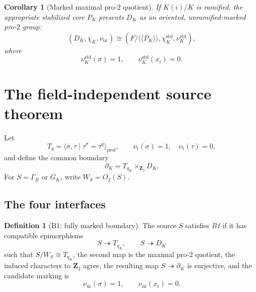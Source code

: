 \documentclass[11pt,reqno]{amsart}
\newtheorem{corollary}[theorem]{Corollary}
\theoremstyle{definition}
\newtheorem{definition}[theorem]{Definition}
\theoremstyle{remark}
\numberwithin{equation}{section}
\newcommand{\Z}{\mathbf Z}
\newcommand{\ur}{\mathrm{ur}}
\newcommand{\tame}{\mathrm{t}}
\newcommand{\prof}{\mathrm{prof}}
\begin{document}
\begin{corollary}[Marked maximal pro-\(2\) quotient]\label{cor:marked-D}
If \(K(i)/K\) is ramified, the appropriate stabilized core \(P_K\)
presents \(D_K\) as an oriented, unramified-marked pro-\(2\) group:
\[
 (D_K,\chi_K,\nu_{\ur})\cong
 \left(F/\overline{\langle\!\langle P_K\rangle\!\rangle},
       \chi_{K}^{\mathrm{std}},
       \nu_{K}^{\mathrm{std}}\right),
\]
where
\[
 \nu_{K}^{\mathrm{std}}(\sigma)=1,\qquad
 \nu_{K}^{\mathrm{std}}(x_i)=0.
\]
\end{corollary}

\section{The field-independent source theorem}\label{sec:source}

Let
\[
 T_q=\langle\sigma,\tau\mid\tau^\sigma=\tau^q\rangle_{\prof},
\qquad
 \nu_{\tame}(\sigma)=1,\quad \nu_{\tame}(\tau)=0,
\]
and define the common boundary
\begin{equation}\label{eq:boundary}
 \partial_K=T_{q_K}\times_{\Z_2}D_K.
\end{equation}
For \(S=\Gamma_R\) or \(G_K\), write \(W_S=O_2(S)\).

\subsection{The four interfaces}

\begin{definition}[B1: fully marked boundary]\label{def:B1}
The source \(S\) satisfies \emph{B1} if it has compatible epimorphisms
\[
 S\twoheadrightarrow T_{q_K},\qquad S\twoheadrightarrow D_K
\]
such that \(S/W_S\cong T_{q_K}\), the second map is the maximal
pro-\(2\) quotient, the induced characters to \(\Z_2\) agree, the
resulting map \(S\twoheadrightarrow\partial_K\) is surjective, and the
candidate marking is
\[
 \nu_{\ur}(\sigma)=1,\qquad \nu_{\ur}(x_i)=0.
\]
\end{definition}
\end{document}
